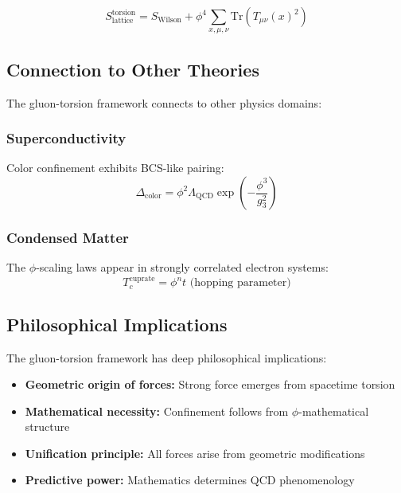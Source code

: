 \begin{equation}
S_{\text{lattice}}^{\text{torsion}} = S_{\text{Wilson}} + \phi^4 \sum_{x,\mu,\nu} \text{Tr}(T_{\mu\nu}(x)^2)
\end{equation}

\subsection{Connection to Other Theories}

The gluon-torsion framework connects to other physics domains:

\subsubsection{Superconductivity}

Color confinement exhibits BCS-like pairing:
\begin{equation}
\Delta_{\text{color}} = \phi^2 \Lambda_{\text{QCD}} \exp\left(-\frac{\phi^3}{g_3^2}\right)
\end{equation}

\subsubsection{Condensed Matter}

The $\phi$-scaling laws appear in strongly correlated electron systems:
\begin{equation}
T_c^{\text{cuprate}} = \phi^n t \text{ (hopping parameter)}
\end{equation}

\subsection{Philosophical Implications}

The gluon-torsion framework has deep philosophical implications:

\begin{itemize}
\item \textbf{Geometric origin of forces:} Strong force emerges from spacetime torsion
\item \textbf{Mathematical necessity:} Confinement follows from $\phi$-mathematical structure  
\item \textbf{Unification principle:} All forces arise from geometric modifications
\item \textbf{Predictive power:} Mathematics determines QCD phenomenology
\end{itemize}

